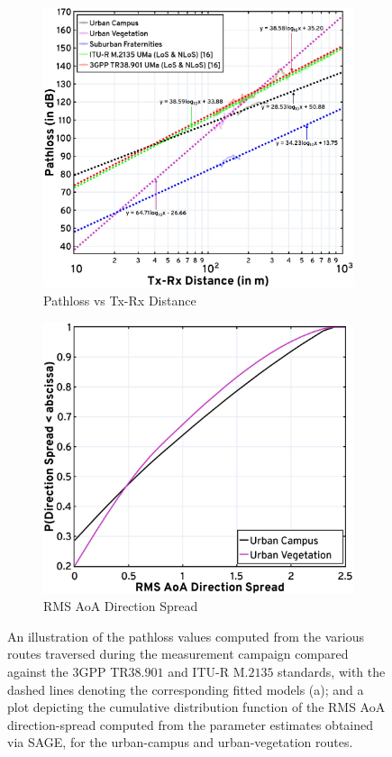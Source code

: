 \documentclass[10pt, twocolumn]{IEEEtran}
\begin{document}
\begin{figure} [t]
     \centering
     \begin{subfigure}{0.496\linewidth}
         \centering
         \includegraphics[width=0.805\linewidth]{figs/pl_distance_updated.jpg}
         \vspace{-1mm}
         \caption{Pathloss vs Tx-Rx Distance}
         \label{F6a}
     \end{subfigure}
     \begin{subfigure}{0.496\linewidth}
         \centering
         \includegraphics[width=0.84\linewidth]{figs/rms_direction_spread_updated.jpg}
         \vspace{-1mm}
         \caption{RMS AoA Direction Spread}
         \label{F6b}
     \end{subfigure}
     \vspace{-2mm}
     \caption{An illustration of the pathloss values computed from the various routes traversed during the measurement campaign compared against the $3$GPP TR$38.901$ and ITU-R M.$2135$ standards, with the dashed lines denoting the corresponding fitted models (a); and a plot depicting the cumulative distribution function of the RMS AoA direction-spread computed from the parameter estimates obtained via SAGE, for the urban-campus and urban-vegetation routes.}
     \label{F6}
     \vspace{-4mm}
\end{figure}
\end{document}
